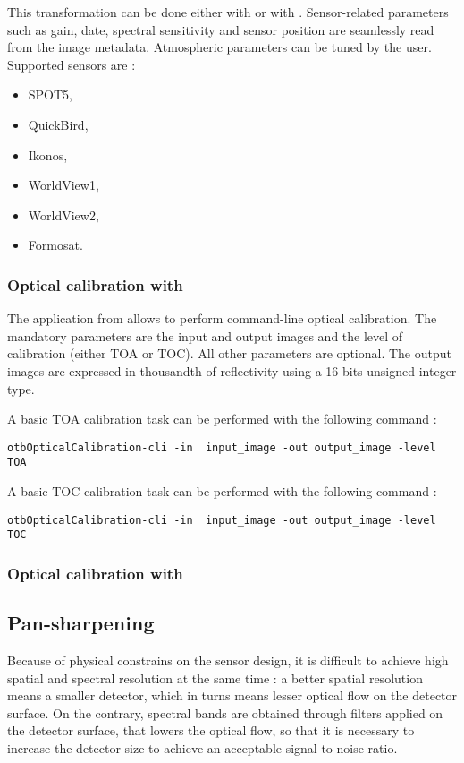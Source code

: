 This transformation can be done either with \app or with
\mont. Sensor-related parameters such as gain, date, spectral
sensitivity and sensor position are seamlessly read from the image
metadata. Atmospheric parameters can be tuned by the user. Supported
sensors are :
\begin{itemize}
\item SPOT5,
\item QuickBird,
\item Ikonos,
\item WorldView1,
\item WorldView2,
\item Formosat.
\end{itemize}

\subsubsection{Optical calibration with \app}

The  application from \app
allows to perform command-line optical calibration. The mandatory
parameters are the input and output images and the level of
calibration (either TOA or TOC). All other parameters are
optional. The output images are expressed in thousandth of
reflectivity using a 16 bits unsigned integer type.

A basic TOA calibration task can be performed with the following command :

\begin{verbatim}
otbOpticalCalibration-cli -in  input_image -out output_image -level TOA
\end{verbatim}

A basic TOC calibration task can be performed with the following command :

\begin{verbatim}
otbOpticalCalibration-cli -in  input_image -out output_image -level TOC
\end{verbatim}

\subsubsection{Optical calibration with \mont}


\subsection{Pan-sharpening}\label{ssec:pxs}

Because of physical constrains on the sensor design, it is difficult
to achieve high spatial and spectral resolution at the same time : a
better spatial resolution means a smaller detector, which in turns
means lesser optical flow on the detector surface. On the contrary,
spectral bands are obtained through filters applied on the detector
surface, that lowers the optical flow, so that it is necessary to
increase the detector size to achieve an acceptable signal to noise
ratio.

